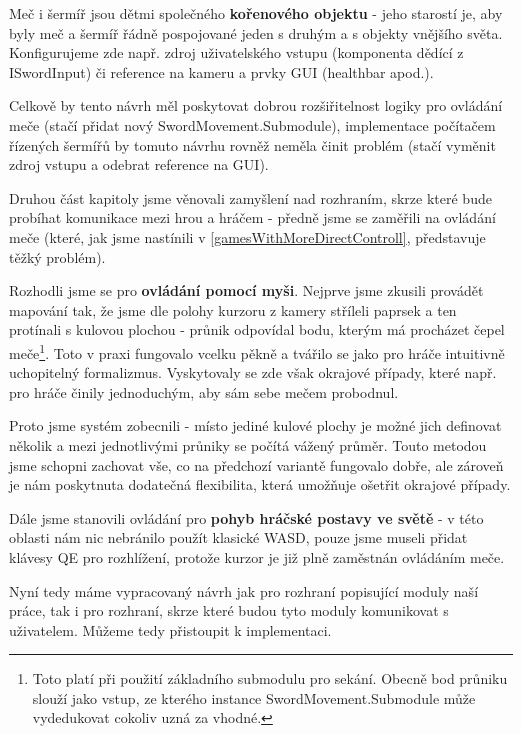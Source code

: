 Meč i šermíř jsou dětmi společného \textbf{kořenového objektu} - jeho starostí je, aby byly meč a šermíř řádně pospojované jeden s druhým a s objekty vnějšího světa. Konfigurujeme zde např. zdroj uživatelského vstupu (komponenta dědící z ISwordInput) či reference na kameru a prvky GUI (healthbar apod.).

Celkově by tento návrh měl poskytovat dobrou rozšiřitelnost logiky pro ovládání meče (stačí přidat nový SwordMovement.Submodule), implementace počítačem řízených šermířů by tomuto návrhu rovněž neměla činit problém (stačí vyměnit zdroj vstupu a odebrat reference na GUI).

\bigbreak

Druhou část kapitoly jsme věnovali zamyšlení nad rozhraním, skrze které bude probíhat komunikace mezi hrou a hráčem - předně jsme se zaměřili na ovládání meče (které, jak jsme nastínili v \ref{gamesWithMoreDirectControll}, představuje těžký problém).

Rozhodli jsme se pro \textbf{ovládání pomocí myši}. Nejprve jsme zkusili provádět mapování tak, že jsme dle polohy kurzoru z kamery stříleli paprsek a ten protínali s kulovou plochou - průnik odpovídal bodu, kterým má procházet čepel meče\footnote{Toto platí při použití základního submodulu pro sekání. Obecně bod průniku slouží jako vstup, ze kterého instance SwordMovement.Submodule může vydedukovat cokoliv uzná za vhodné.}. Toto v praxi fungovalo vcelku pěkně a tvářilo se jako pro hráče intuitivně uchopitelný formalizmus. Vyskytovaly se zde však okrajové případy, které např. pro hráče činily jednoduchým, aby sám sebe mečem probodnul.

Proto jsme systém zobecnili - místo jediné kulové plochy je možné jich definovat několik a mezi jednotlivými průniky se počítá vážený průměr. Touto metodou jsme schopni zachovat vše, co na předchozí variantě fungovalo dobře, ale zároveň je nám poskytnuta dodatečná flexibilita, která umožňuje ošetřit okrajové případy.

Dále jsme stanovili ovládání pro \textbf{pohyb hráčské postavy ve světě} - v této oblasti nám nic nebránilo použít klasické WASD, pouze jsme museli přidat klávesy QE pro rozhlížení, protože kurzor je již plně zaměstnán ovládáním meče.

\bigbreak
Nyní tedy máme vypracovaný návrh jak pro rozhraní popisující moduly naší práce, tak i pro rozhraní, skrze které budou tyto moduly komunikovat s uživatelem. Můžeme tedy přistoupit k implementaci.